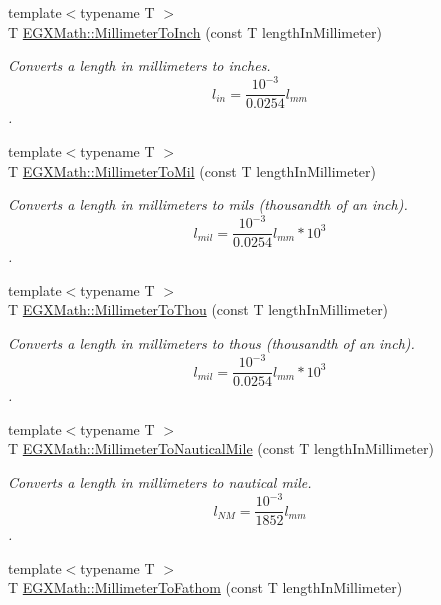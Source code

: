 \begin{DoxyCompactItemize}
{\footnotesize template$<$typename T $>$ }\\T \mbox{\hyperlink{group___e_g_x_math-_conversions-_length_conversions-_s_i-_millimeter-_imperial_gaaf0d8029c38ed975edf3805a0a3a53f7}{E\+G\+X\+Math\+::\+Millimeter\+To\+Inch}} (const T length\+In\+Millimeter)
\begin{DoxyCompactList}\small\item\em Converts a length in millimeters to inches. \[ l_{in}= \frac{10^{-3}}{0.0254} l_{mm} \]. \end{DoxyCompactList}\item 
{\footnotesize template$<$typename T $>$ }\\T \mbox{\hyperlink{group___e_g_x_math-_conversions-_length_conversions-_s_i-_millimeter-_imperial_gaf811317f4ce575df4ff0329491e92fac}{E\+G\+X\+Math\+::\+Millimeter\+To\+Mil}} (const T length\+In\+Millimeter)
\begin{DoxyCompactList}\small\item\em Converts a length in millimeters to mils (thousandth of an inch). \[ l_{mil}= \frac{10^{-3}}{0.0254} l_{mm} * 10^{3} \]. \end{DoxyCompactList}\item 
{\footnotesize template$<$typename T $>$ }\\T \mbox{\hyperlink{group___e_g_x_math-_conversions-_length_conversions-_s_i-_millimeter-_imperial_ga099bde3b0f85fbbfbe91f0162a392835}{E\+G\+X\+Math\+::\+Millimeter\+To\+Thou}} (const T length\+In\+Millimeter)
\begin{DoxyCompactList}\small\item\em Converts a length in millimeters to thous (thousandth of an inch). \[ l_{mil}= \frac{10^{-3}}{0.0254} l_{mm} * 10^{3} \]. \end{DoxyCompactList}\item 
{\footnotesize template$<$typename T $>$ }\\T \mbox{\hyperlink{group___e_g_x_math-_conversions-_length_conversions-_s_i-_millimeter-_nautical_ga05ed5fb1300287763d8927ee90315808}{E\+G\+X\+Math\+::\+Millimeter\+To\+Nautical\+Mile}} (const T length\+In\+Millimeter)
\begin{DoxyCompactList}\small\item\em Converts a length in millimeters to nautical mile. \[ l_{NM}= \frac{10^{-3}}{1852} l_{mm} \]. \end{DoxyCompactList}\item 
{\footnotesize template$<$typename T $>$ }\\T \mbox{\hyperlink{group___e_g_x_math-_conversions-_length_conversions-_s_i-_millimeter-_nautical_ga1dce4ee3123e0132aae95bc9f7d0ac31}{E\+G\+X\+Math\+::\+Millimeter\+To\+Fathom}} (const T length\+In\+Millimeter)

\end{DoxyCompactItemize}
